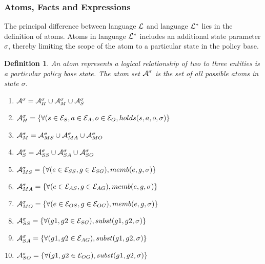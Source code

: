 \documentclass[10pt, twocolumn]{article}
\newtheorem{definition}{Definition}
\begin{document}
      \subsubsection{Atoms, Facts and Expressions}

        The principal difference between language ${\cal L}$ and language
        ${\cal L}^{*}$ lies in the definition of atoms. Atoms in language
        ${\cal L}^{*}$ includes an additional state parameter $\sigma$, thereby
        limiting the scope of the atom to a particular state in the policy
        base.

        \begin{definition}
          An atom represents a logical relationship of two to three entities
          is a particular policy base state. The atom set $\cal{A}^{\sigma}$ is
          the set of all possible atoms in state $\sigma$.

          \begin{enumerate}
            \item
              ${\cal A}^{\sigma} = {\cal A}^{\sigma}_{H} \cup {\cal A}^{\sigma}_{M} \cup {\cal A}^{\sigma}_{S}$
            \item
              ${\cal A}^{\sigma}_{H} = \{\forall (s \in {\cal E}_{S}, a \in {\cal E}_{A}, o \in {\cal E}_{O}, holds(s, a, o, \sigma) \}$
            \item
              ${\cal A}^{\sigma}_{M} = {\cal A}^{\sigma}_{MS} \cup {\cal A}^{\sigma}_{MA} \cup {\cal A}^{\sigma}_{MO}$
            \item
              ${\cal A}^{\sigma}_{S} = {\cal A}^{\sigma}_{SS} \cup {\cal A}^{\sigma}_{SA} \cup {\cal A}^{\sigma}_{SO}$
            \item
              ${\cal A}^{\sigma}_{MS} = \{\forall (e \in {\cal E}_{SS}, g \in {\cal E}_{SG}), memb(e, g, \sigma)\}$
            \item
              ${\cal A}^{\sigma}_{MA} = \{\forall (e \in {\cal E}_{AS}, g \in {\cal E}_{AG}), memb(e, g, \sigma)\}$
            \item
              ${\cal A}^{\sigma}_{MO} = \{\forall (e \in {\cal E}_{OS}, g \in {\cal E}_{OG}), memb(e, g, \sigma)\}$
            \item
              ${\cal A}^{\sigma}_{SS} = \{\forall (g1, g2 \in {\cal E}_{SG}), subst(g1, g2, \sigma)\}$
            \item
              ${\cal A}^{\sigma}_{SA} = \{\forall (g1, g2 \in {\cal E}_{AG}), subst(g1, g2, \sigma)\}$
            \item
              ${\cal A}^{\sigma}_{SO} = \{\forall (g1, g2 \in {\cal E}_{OG}), subst(g1, g2, \sigma)\}$
          \end{enumerate}

        \end{definition} 
\end{document}
